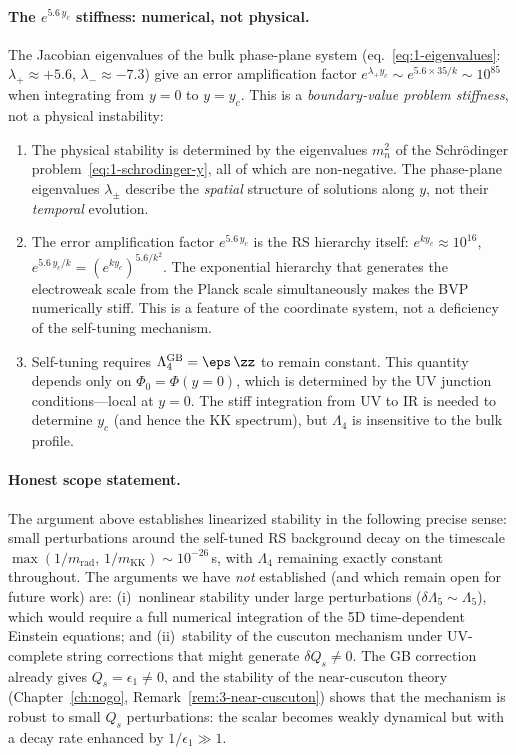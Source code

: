 \paragraph{The $e^{5.6\,y_c}$ stiffness: numerical, not physical.}
The Jacobian eigenvalues of the bulk phase-plane system (eq.~\eqref{eq:1-eigenvalues}: $\lambda_+ \approx +5.6$, $\lambda_- \approx -7.3$) give an error amplification factor $e^{\lambda_+ y_c} \sim e^{5.6 \times 35/k} \sim 10^{85}$ when integrating from $y = 0$ to $y = y_c$. This is a \emph{boundary-value problem stiffness}, not a physical instability:
\begin{enumerate}
\item The physical stability is determined by the eigenvalues $m_n^2$ of the Schr\"{o}dinger problem~\eqref{eq:1-schrodinger-y}, all of which are non-negative. The phase-plane eigenvalues $\lambda_\pm$ describe the \emph{spatial} structure of solutions along $y$, not their \emph{temporal} evolution.
\item The error amplification factor $e^{5.6\, y_c}$ is the RS hierarchy itself: $e^{ky_c} \approx 10^{16}$, $e^{5.6\, y_c/k} = (e^{ky_c})^{5.6/k^2}$. The exponential hierarchy that generates the electroweak scale from the Planck scale simultaneously makes the BVP numerically stiff. This is a feature of the coordinate system, not a deficiency of the self-tuning mechanism.
\item Self-tuning requires $\Lambda_4^{\mathrm{GB}} = \eps\,\zz$ to remain constant. This quantity depends only on $\Phi_0 = \Phi(y{=}0)$, which is determined by the UV junction conditions---local at $y = 0$. The stiff integration from UV to IR is needed to determine $y_c$ (and hence the KK spectrum), but $\Lambda_4$ is insensitive to the bulk profile.
\end{enumerate}

\paragraph{Honest scope statement.} The argument above establishes linearized stability in the following precise sense: small perturbations around the self-tuned RS background decay on the timescale $\max(1/m_{\mathrm{rad}},\, 1/m_{\mathrm{KK}}) \sim 10^{-26}\,$s, with $\Lambda_4$ remaining exactly constant throughout. The arguments we have \emph{not} established (and which remain open for future work) are: (i)~nonlinear stability under large perturbations ($\delta\Lambda_5 \sim \Lambda_5$), which would require a full numerical integration of the 5D time-dependent Einstein equations; and (ii)~stability of the cuscuton mechanism under UV-complete string corrections that might generate $\delta Q_s \neq 0$. The GB correction already gives $Q_s = \epsilon_1 \neq 0$, and the stability of the near-cuscuton theory (Chapter~\ref{ch:nogo}, Remark~\ref{rem:3-near-cuscuton}) shows that the mechanism is robust to small $Q_s$ perturbations: the scalar becomes weakly dynamical but with a decay rate enhanced by $1/\epsilon_1 \gg 1$.


